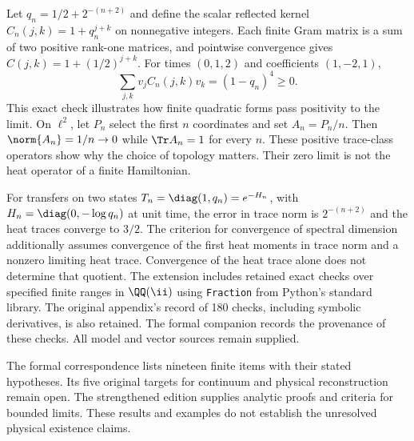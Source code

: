 Let $q_n=1/2+2^{-(n+2)}$ and define the scalar reflected kernel $C_n(j,k)=1+q_n^{j+k}$ on nonnegative integers. Each finite Gram matrix is a sum of two positive rank-one matrices, and pointwise convergence gives $C(j,k)=1+(1/2)^{j+k}$. For times $(0,1,2)$ and coefficients $(1,-2,1)$,
\[
\sum_{j,k}v_jC_n(j,k)v_k=(1-q_n)^4\geq0.
\]
This exact check illustrates how finite quadratic forms pass positivity to the limit.
On $\ell^2$, let $P_n$ select the first $n$ coordinates and set $A_n=P_n/n$. Then $\norm{A_n}=1/n\to0$ while $\Tr A_n=1$ for every $n$. These positive trace-class operators show why the choice of topology matters. Their zero limit is not the heat operator of a finite Hamiltonian.

For transfers on two states $T_n=\diag(1,q_n)=e^{-H_n}$, with $H_n=\diag(0,-\log q_n)$ at unit time, the error in trace norm is $2^{-(n+2)}$ and the heat traces converge to $3/2$. The criterion for convergence of spectral dimension additionally assumes convergence of the first heat moments in trace norm and a nonzero limiting heat trace. Convergence of the heat trace alone does not determine that quotient.
The extension includes retained exact checks over specified finite ranges in $\QQ(\ii)$ using \texttt{Fraction} from Python's standard library. The original appendix's record of 180 checks, including symbolic derivatives, is also retained. The formal companion records the provenance of these checks. All model and vector sources remain supplied.

The formal correspondence lists nineteen finite items with their stated hypotheses. Its five original targets for continuum and physical reconstruction remain open. The strengthened edition supplies analytic proofs and criteria for bounded limits. These results and examples do not establish the unresolved physical existence claims.
